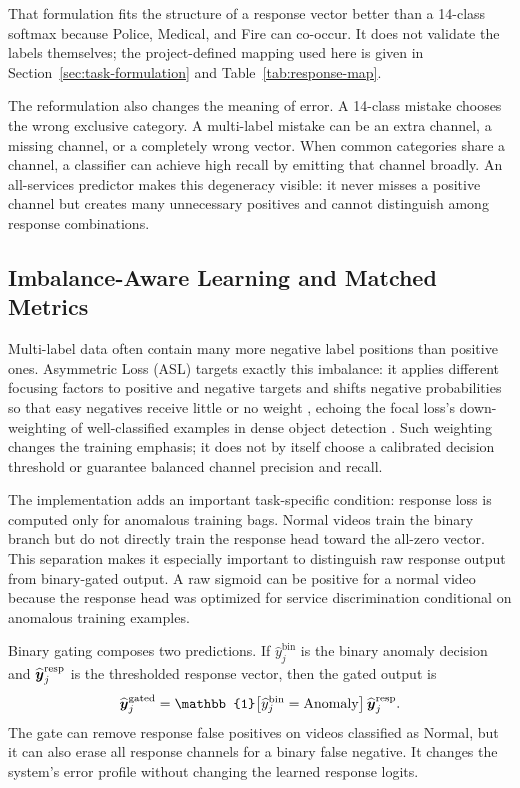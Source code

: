 That formulation fits the structure of a response vector better than a
14-class softmax because Police, Medical, and Fire can co-occur. It does not
validate the labels themselves; the project-defined mapping used here is given
in Section~\ref{sec:task-formulation} and Table~\ref{tab:response-map}.

The reformulation also changes the meaning of error. A 14-class mistake chooses
the wrong exclusive category. A multi-label mistake can be an extra channel, a
missing channel, or a completely wrong vector. When common categories share a
channel, a classifier can achieve high recall by emitting that channel broadly.
An all-services predictor makes this degeneracy visible: it never misses a
positive channel but creates many unnecessary positives and cannot distinguish
among response combinations.

\subsection{Imbalance-Aware Learning and Matched Metrics}

Multi-label data often contain many more negative label positions than positive
ones. Asymmetric Loss (ASL) targets exactly this imbalance: it applies
different focusing factors to positive and negative targets and shifts
negative probabilities so that easy negatives receive little or no weight
\cite{ridnik2021asymmetric}, echoing the focal loss's down-weighting of
well-classified examples in dense object detection \cite{lin2017focal}. Such
weighting changes the training emphasis; it does not by itself choose a
calibrated decision threshold or guarantee balanced channel precision and
recall.

The implementation adds an important task-specific condition: response loss is
computed only for anomalous training bags. Normal videos train the binary branch
but do not directly train the response head toward the all-zero vector. This
separation makes it especially important to distinguish raw response output
from binary-gated output. A raw sigmoid can be positive for a normal video
because the response head was optimized for service discrimination conditional
on anomalous training examples.

Binary gating composes two predictions. If $\widehat{y}^{\mathrm{bin}}_j$ is the
binary anomaly decision and $\widehat{\boldsymbol{y}}^{\mathrm{resp}}_j$ is the
thresholded response vector, then the gated output is
\begin{equation}
    \widehat{\vect{y}}^{\mathrm{gated}}_j
    = \mathbb{1}\!\left[\widehat{y}^{\mathrm{bin}}_j=\text{Anomaly}\right]
      \widehat{\vect{y}}^{\mathrm{resp}}_j.
\end{equation}
The gate can remove response false positives on videos classified as Normal, but
it can also erase all response channels for a binary false negative. It changes
the system's error profile without changing the learned response logits.

